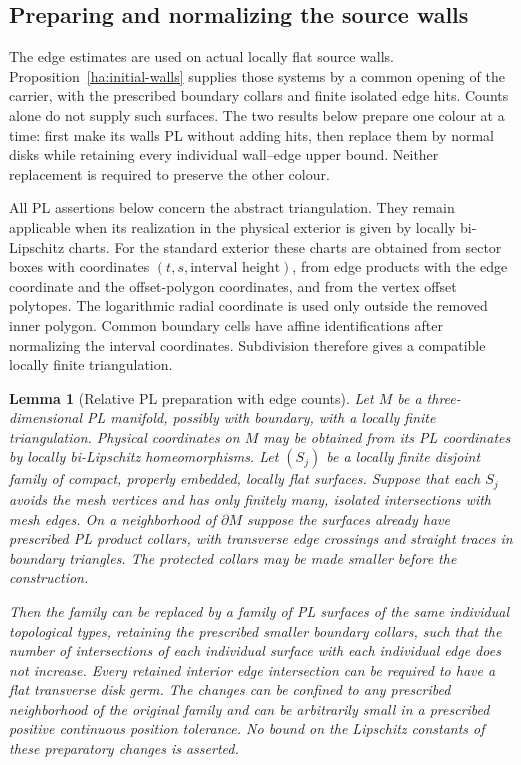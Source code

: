 \documentclass[11pt]{article}
\numberwithin{equation}{section}
\newtheorem{lemma}[theorem]{Lemma}
\theoremstyle{definition}
\theoremstyle{remark}
\begin{document}
\subsection{Preparing and normalizing the source walls}
\label{wl:normalization-subsection}

The edge estimates are used on actual locally flat source walls.
Proposition~\ref{ha:initial-walls} supplies those systems by a common
opening of the carrier, with the prescribed boundary collars and finite
isolated edge hits.  Counts alone do not supply such surfaces.  The two
results below prepare one colour at a time: first make its walls PL
without adding hits, then replace them by normal disks while retaining
every individual wall--edge upper bound.  Neither replacement is
required to preserve the other colour.

All PL assertions below concern the abstract triangulation.  They remain
applicable when its realization in the physical exterior is given by locally
bi-Lipschitz charts.  For the standard exterior these charts are obtained from
sector boxes with coordinates $(t,s,\text{interval height})$, from edge products
with the edge coordinate and the offset-polygon coordinates, and from the
vertex offset polytopes.  The logarithmic radial coordinate is used only outside
the removed inner polygon.  Common boundary cells have affine identifications
after normalizing the interval coordinates.  Subdivision therefore gives a
compatible locally finite triangulation.

\begin{lemma}[Relative PL preparation with edge counts]\label{wl:relative-pl}
Let $M$ be a three-dimensional PL manifold, possibly with boundary, with a
locally finite triangulation.  Physical coordinates on $M$ may be obtained
from its PL coordinates by locally bi-Lipschitz homeomorphisms.  Let
$(S_j)$ be a locally finite disjoint family of compact, properly embedded,
locally flat surfaces.  Suppose that each $S_j$ avoids the mesh vertices
and has only finitely many, isolated intersections with mesh edges.
On a neighborhood of $\partial M$ suppose the surfaces already have
prescribed PL product collars, with transverse edge crossings and straight
traces in boundary triangles.  The protected collars may be made smaller
before the construction.

Then the family can be replaced by a family of PL surfaces of the same
individual topological types, retaining the prescribed smaller boundary
collars, such that the number of intersections of each individual surface
with each individual edge does not increase.  Every retained interior
edge intersection can be required to have a flat transverse disk germ.
The changes can be confined to any prescribed neighborhood of the original
family and can be arbitrarily small in a prescribed positive continuous
position tolerance.  No bound on the Lipschitz constants of these
preparatory changes is asserted.
\end{lemma}
\end{document}
